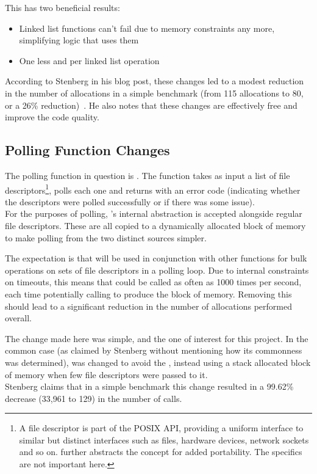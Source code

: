 This has two beneficial results:

\begin{itemize}
	\item Linked list functions can't fail due to memory constraints any more, simplifying logic that uses them
	\item One less \malloc{} and \free{} per linked list operation
\end{itemize}

According to Stenberg in his blog post, these changes led to a modest reduction in the number of allocations in a simple benchmark (from 115 allocations to 80, or a 26\% reduction)~\cite{curlmalloc}. He also notes that these changes are effectively free and improve the code quality.

\subsection{Polling Function Changes}

The polling function in question is . The function takes as input a list of file descriptors\footnote{A file descriptor is part of the POSIX API, providing a uniform interface to similar but distinct interfaces such as files, hardware devices, network sockets and so on.  further abstracts the concept for added portability. The specifics are not important here.}, polls each one and returns with an error code (indicating whether the descriptors were polled successfully or if there was some issue).\\
For the purposes of polling, 's internal abstraction is accepted alongside regular file descriptors. These are all copied to a dynamically allocated block of memory to make polling from the two distinct sources simpler.

The expectation is that  will be used in conjunction with other functions for bulk operations on sets of file descriptors in a polling loop. Due to internal constraints on timeouts, this means that  could be called as often as 1000 times per second, each time potentially calling \malloc{} to produce the block of memory. Removing this \malloc{} should lead to a significant reduction in the number of allocations performed overall.

The change made here was simple, and the one of interest for this project. In the common case (as claimed by Stenberg without mentioning how its commonness was determined),  was changed to avoid the \malloc{}, instead using a stack allocated block of memory when few file descriptors were passed to it.\\
Stenberg claims that in a simple benchmark this change resulted in a 99.62\% decrease (33,961 to 129) in the number of \malloc{} calls.

